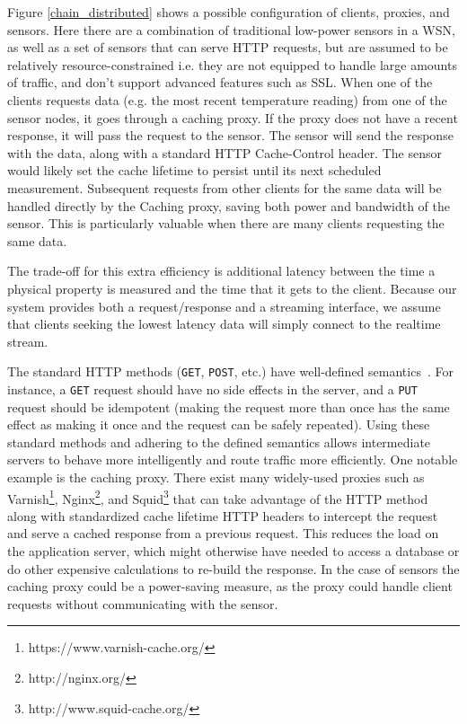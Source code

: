 \documentclass{acm_proc_article-sp}
\begin{document}
Figure \ref{chain_distributed} shows a possible configuration of clients,
proxies, and sensors. Here there are a combination of traditional low-power
sensors in a WSN, as well as a set of sensors that
can serve HTTP requests, but are assumed to be relatively resource-constrained
i.e.  they are not equipped to handle large amounts of traffic, and don't
support advanced features such as SSL. When one of the clients requests data
(e.g. the most recent temperature reading) from one of the sensor nodes, it
goes through a caching proxy. If the proxy does not have a recent response, it
will pass the request to the sensor. The sensor will send the response with the
data, along with a standard HTTP Cache-Control header. The sensor would likely
set the cache lifetime to persist until its next scheduled measurement.
Subsequent requests from other clients for the same data will be handled
directly by the Caching proxy, saving both power and bandwidth of the sensor.
This is particularly valuable when there are many clients requesting the same
data.

The trade-off for this extra efficiency is additional latency between the time
a physical property is measured and the time that it gets to the client.
Because our system provides both a request/response and a streaming interface,
we assume that clients seeking the lowest latency data will simply connect to
the realtime stream.

The standard HTTP methods (\texttt{GET}, \texttt{POST}, etc.) have well-defined
semantics~\cite{httpmethods}. For instance, a \texttt{GET} request should have
no side effects in the server, and a \texttt{PUT} request should be idempotent
(making the request more than once has the same effect as making it once and
the request can be safely repeated). Using these standard methods and adhering
to the defined semantics allows intermediate servers to behave more
intelligently and route traffic more efficiently. One notable example is the
caching proxy. There exist many widely-used proxies such as
Varnish\footnote{https://www.varnish-cache.org/},
Nginx\footnote{http://nginx.org/}, and
Squid\footnote{http://www.squid-cache.org/} that can take advantage of the HTTP
method along with standardized cache lifetime HTTP headers to intercept the
request and serve a cached response from a previous request. This reduces the
load on the application server, which might otherwise have needed to access a
database or do other expensive calculations to re-build the response. In the
case of sensors the caching proxy could be a power-saving measure, as the proxy
could handle client requests without communicating with the sensor.
\end{document}
